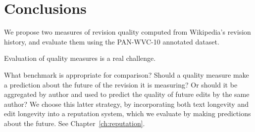 \section{Conclusions}

We propose two measures of revision quality computed
from Wikipedia's revision history, and evaluate them
using the PAN-WVC-10 annotated dataset.


Evaluation of quality measures is a real challenge.

What benchmark is appropriate for comparison?
Should a quality measure make a prediction about
the future of the revision it is measuring?
Or should it be aggregated by author and used
to predict the quality of future edits by the
same author?
We choose this latter strategy, by incorporating
both text longevity and edit longevity into a reputation
system, which we evaluate by making predictions about the
future.
See Chapter~\ref{ch:reputation}.



